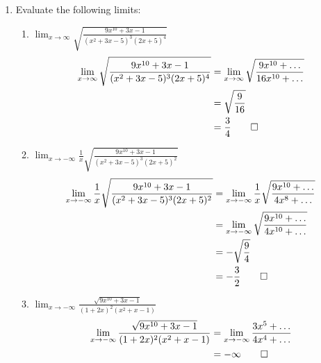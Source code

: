 \documentclass[12pt, a4paper]{article}
\begin{document}
\begin{enumerate}[Q\arabic*.]
  \item Evaluate the following limits:
    \begin{enumerate}[(\alph*)]
      \item $\displaystyle \lim_{x\to\infty}\sqrt{\frac{9x^{10}+3x-1}{(x^2+3x-5)^3(2x+5)^4}}$
        \begin{align*}
        \lim_{x\to\infty}\sqrt{\frac{9x^{10}+3x-1}{(x^2+3x-5)^3(2x+5)^4}} &= \lim_{x\to\infty}\sqrt{\frac{9x^{10}+\ldots}{16x^{10}+\ldots}}\\
                                                                          &= \sqrt{\frac{9}{16}} \\
                                                                          &= \frac{3}{4} \qed
        \end{align*}
      \item $\displaystyle \lim_{x\to-\infty}\frac{1}{x}\sqrt{\frac{9x^{10}+3x-1}{(x^2+3x-5)^3(2x+5)^2}}$
        \begin{align*}
          \lim_{x\to-\infty}\frac{1}{x}\sqrt{\frac{9x^{10}+3x-1}{(x^2+3x-5)^3(2x+5)^2}} &= \lim_{x\to-\infty}\frac{1}{x}\sqrt{\frac{9x^{10}+\ldots}{4x^8+\ldots}} \\
                                                                                        &= \lim_{x\to-\infty}\sqrt{\frac{9x^{10}+\ldots}{4x^{10}+\ldots}} \\
                                                                 &= -\sqrt{\frac{9}{4}} \\
                                                                 &= -\frac{3}{2} \qed
        \end{align*}
      \item $\displaystyle \lim_{x\to-\infty}\frac{\sqrt{9x^{10}+3x-1}}{(1+2x)^2(x^2+x-1)}$
        \begin{align*}
          \lim_{x\to-\infty}\frac{\sqrt{9x^{10}+3x-1}}{(1+2x)^2(x^2+x-1)} &= \lim_{x\to-\infty}\frac{3x^5+\ldots}{4x^4+\ldots} \\
                                                                          &= -\infty \qed
        \end{align*}
    \end{enumerate}
\end{enumerate}
\end{document}
